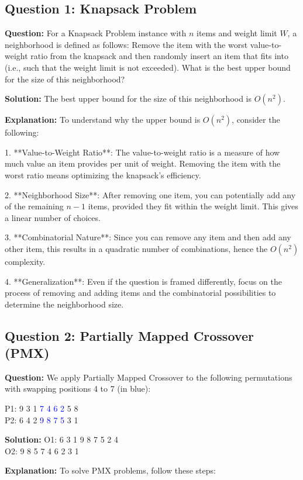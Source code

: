 \subsection{Question 1: Knapsack Problem}
\textbf{Question:} For a Knapsack Problem instance with \( n \) items and weight limit \( W \), a neighborhood is defined as follows: Remove the item with the worst value-to-weight ratio from the knapsack and then randomly insert an item that fits into (i.e., such that the weight limit is not exceeded). What is the best upper bound for the size of this neighborhood?

\textbf{Solution:}
The best upper bound for the size of this neighborhood is \( O(n^2) \).

\textbf{Explanation:}
To understand why the upper bound is \( O(n^2) \), consider the following:

1. **Value-to-Weight Ratio**: The value-to-weight ratio is a measure of how much value an item provides per unit of weight. Removing the item with the worst ratio means optimizing the knapsack's efficiency.

2. **Neighborhood Size**: After removing one item, you can potentially add any of the remaining \( n-1 \) items, provided they fit within the weight limit. This gives a linear number of choices.

3. **Combinatorial Nature**: Since you can remove any item and then add any other item, this results in a quadratic number of combinations, hence the \( O(n^2) \) complexity.

4. **Generalization**: Even if the question is framed differently, focus on the process of removing and adding items and the combinatorial possibilities to determine the neighborhood size.

\subsection{Question 2: Partially Mapped Crossover (PMX)}
\textbf{Question:} We apply Partially Mapped Crossover to the following permutations with swapping positions 4 to 7 (in blue):

P1: 9 3 1 \textcolor{blue}{7 4 6 2} 5 8\\
P2: 6 4 2 \textcolor{blue}{9 8 7 5} 3 1

\textbf{Solution:}
O1: 6 3 1 9 8 7 5 2 4\\
O2: 9 8 5 7 4 6 2 3 1

\textbf{Explanation:}
To solve PMX problems, follow these steps:

